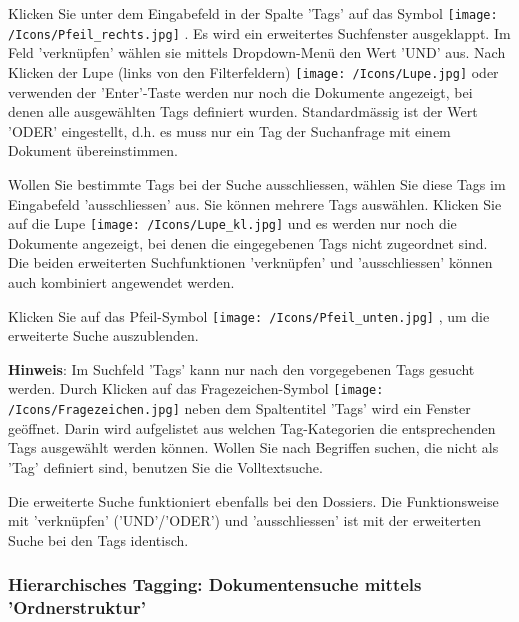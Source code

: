 Klicken Sie unter dem Eingabefeld in der Spalte 'Tags' auf das Symbol \texttt{[image: /Icons/Pfeil\_rechts.jpg]} . Es wird ein erweitertes Suchfenster ausgeklappt. Im Feld 'verknüpfen'  wählen sie mittels Dropdown-Menü den Wert 'UND'  aus. Nach Klicken der Lupe (links von den Filterfeldern) \texttt{[image: /Icons/Lupe.jpg]}  oder verwenden der 'Enter'-Taste werden nur noch die Dokumente angezeigt, bei denen alle ausgewählten Tags definiert wurden. Standardmässig ist der Wert 'ODER' eingestellt, d.h. es muss nur ein Tag der Suchanfrage mit einem Dokument übereinstimmen. \newline

Wollen Sie bestimmte Tags bei der Suche ausschliessen, wählen Sie diese Tags im Eingabefeld 'ausschliessen'  aus. Sie können mehrere Tags auswählen. Klicken Sie auf die Lupe \texttt{[image: /Icons/Lupe\_kl.jpg]} und es werden nur noch die Dokumente angezeigt, bei denen die eingegebenen Tags nicht zugeordnet sind. Die beiden erweiterten Suchfunktionen 'verknüpfen' und 'ausschliessen' können auch kombiniert angewendet werden.

\vspace{\baselineskip}

Klicken Sie auf das Pfeil-Symbol \texttt{[image: /Icons/Pfeil\_unten.jpg]} , um die erweiterte Suche auszublenden.

\vspace{\baselineskip}

\textbf{Hinweis}: Im Suchfeld 'Tags' kann nur nach den vorgegebenen Tags gesucht werden. Durch Klicken auf das Fragezeichen-Symbol \texttt{[image: /Icons/Fragezeichen.jpg]} neben dem Spaltentitel 'Tags' wird ein Fenster geöffnet. Darin wird aufgelistet aus welchen Tag-Kategorien die entsprechenden Tags ausgewählt werden können. Wollen Sie nach Begriffen suchen, die nicht als 'Tag' definiert sind, benutzen Sie die Volltextsuche.

\vspace{\baselineskip}

Die erweiterte Suche funktioniert ebenfalls bei den Dossiers. Die Funktionsweise mit 'verknüpfen' ('UND'/'ODER') und 'ausschliessen' ist mit der erweiterten Suche bei den Tags identisch.

\subsubsection{Hierarchisches Tagging: Dokumentensuche mittels 'Ordnerstruktur'}

